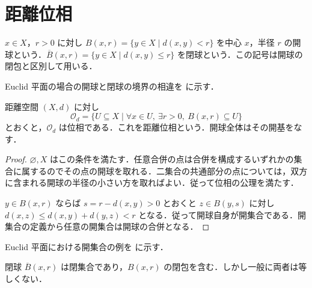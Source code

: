 \section{距離位相}
\begin{defn}[開球と閉球]
$x\in X$，$r>0$ に対し $B(x,r)=\{y\in X\mid d(x,y)<r\}$ を中心 $x$，半径 $r$ の開球という．$\overline B(x,r)=\{y\in X\mid d(x,y)\leq r\}$ を閉球という．この記号は開球の閉包と区別して用いる．
\end{defn}
Euclid 平面の場合の開球と閉球の境界の相違を  に示す．
\begin{prop}[距離位相]
距離空間 $(X,d)$ に対し
\[
 \mathcal O_d=\{U\subseteq X\mid \forall x\in U,\ \exists r>0,\ B(x,r)\subseteq U\}
\]
とおくと，$\mathcal O_d$ は位相である．これを距離位相という．開球全体はその開基をなす．
\end{prop}
\begin{proof}
$\varnothing,X$ はこの条件を満たす．任意合併の点は合併を構成するいずれかの集合に属するのでその点の開球を取れる．二集合の共通部分の点については，双方に含まれる開球の半径の小さい方を取ればよい．従って位相の公理を満たす．

$y\in B(x,r)$ ならば $s=r-d(x,y)>0$ とおくと $z\in B(y,s)$ に対し $d(x,z)\leq d(x,y)+d(y,z)<r$ となる．従って開球自身が開集合である．開集合の定義から任意の開集合は開球の合併となる．
\end{proof}
Euclid 平面における開集合の例を  に示す．
\begin{prop}[閉球と開球の閉包]
閉球 $\overline B(x,r)$ は閉集合であり，$B(x,r)$ の閉包を含む．しかし一般に両者は等しくない．
\end{prop}
